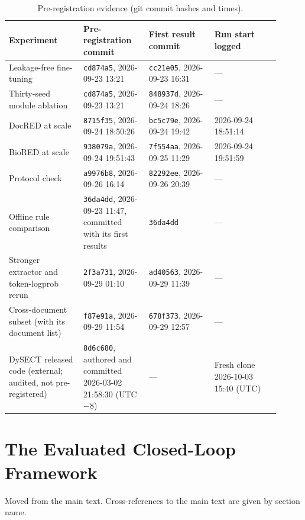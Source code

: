 \documentclass[11pt]{article}
\begin{document}
\begin{table}[htbp]
\centering
\caption{Pre-registration evidence (git commit hashes and times).}
\label{tab:s13-prereg}
\small
\begin{tabular}{@{}p{0.25\linewidth}p{0.22\linewidth}p{0.22\linewidth}p{0.22\linewidth}@{}}
\toprule
Experiment & Pre-registration commit & First result commit & Run start logged \\
\midrule
Leakage-free fine-tuning & \texttt{cd874a5}, 2026-09-23 13:21 & \texttt{cc21e05}, 2026-09-23 16:31 & --- \\
Thirty-seed module ablation & \texttt{cd874a5}, 2026-09-23 13:21 & \texttt{848937d}, 2026-09-24 18:26 & --- \\
DocRED at scale & \texttt{8715f35}, 2026-09-24 18:50:26 & \texttt{bc5c79e}, 2026-09-24 19:42 & 2026-09-24 18:51:14 \\
BioRED at scale & \texttt{938079a}, 2026-09-24 19:51:43 & \texttt{7f554aa}, 2026-09-25 11:29 & 2026-09-24 19:51:59 \\
Protocol check & \texttt{a9976b8}, 2026-09-26 16:14 & \texttt{82292ee}, 2026-09-26 20:39 & --- \\
Offline rule comparison & \texttt{36da4dd}, 2026-09-23 11:47, committed with its first results & \texttt{36da4dd} & --- \\
Stronger extractor and token-logprob rerun & \texttt{2f3a731}, 2026-09-29 01:10 & \texttt{ad40563}, 2026-09-29 11:39 & --- \\
Cross-document subset (with its document list) & \texttt{f87e91a}, 2026-09-29 11:54 & \texttt{678f373}, 2026-09-29 12:57 & --- \\
\midrule
DySECT released code (external; audited, not pre-registered) & \texttt{8d6c680}, authored and committed 2026-03-02 21:58:30 (UTC$-$8) & --- & Fresh clone 2026-10-03 15:40 (UTC) \\
\bottomrule
\end{tabular}
\end{table}


\section{The Evaluated Closed-Loop Framework}
\label{sec:s13}

Moved from the main text. Cross-references to the main text are given by
section name.
\end{document}
